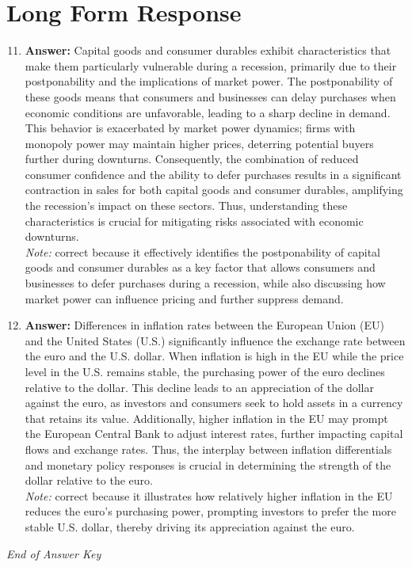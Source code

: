 \documentclass[12pt]{article}
\begin{document}
\section*{Long Form Response}
\begin{enumerate}[label=\arabic*.]
\setcounter{enumi}{10}
\item \textbf{Answer:} Capital goods and consumer durables exhibit characteristics that make them particularly vulnerable during a recession, primarily due to their postponability and the implications of market power. The postponability of these goods means that consumers and businesses can delay purchases when economic conditions are unfavorable, leading to a sharp decline in demand. This behavior is exacerbated by market power dynamics; firms with monopoly power may maintain higher prices, deterring potential buyers further during downturns. Consequently, the combination of reduced consumer confidence and the ability to defer purchases results in a significant contraction in sales for both capital goods and consumer durables, amplifying the recession's impact on these sectors. Thus, understanding these characteristics is crucial for mitigating risks associated with economic downturns.
\\ \textit{Note:} correct because it effectively identifies the postponability of capital goods and consumer durables as a key factor that allows consumers and businesses to defer purchases during a recession, while also discussing how market power can influence pricing and further suppress demand.
\item \textbf{Answer:} Differences in inflation rates between the European Union (EU) and the United States (U.S.) significantly influence the exchange rate between the euro and the U.S. dollar. When inflation is high in the EU while the price level in the U.S. remains stable, the purchasing power of the euro declines relative to the dollar. This decline leads to an appreciation of the dollar against the euro, as investors and consumers seek to hold assets in a currency that retains its value. Additionally, higher inflation in the EU may prompt the European Central Bank to adjust interest rates, further impacting capital flows and exchange rates. Thus, the interplay between inflation differentials and monetary policy responses is crucial in determining the strength of the dollar relative to the euro.
\\ \textit{Note:} correct because it illustrates how relatively higher inflation in the EU reduces the euro's purchasing power, prompting investors to prefer the more stable U.S. dollar, thereby driving its appreciation against the euro.
\end{enumerate}

\vfill
\noindent\textit{End of Answer Key}
\end{document}
